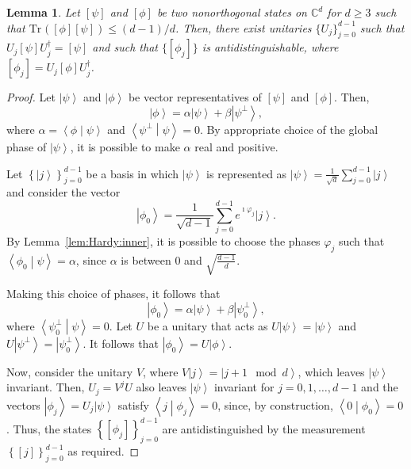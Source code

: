\documentclass[DIV=calc,fontsize=12pt]{scrartcl} %
\theoremstyle{definition}
\theoremstyle{plain}
\newtheorem{lemma}[definition]{Lemma}
\newcommand{\Ket}[1]{\ensuremath{\left \vert #1 \right \rangle}}
\newcommand{\BraKet}[2]{\ensuremath{\left \langle #1 \middle \vert #2
\right \rangle}}
\newcommand{\Proj}[1]{\ensuremath{\left [ #1 \right ]}}
\newcommand{\Tr}[2][]{\ensuremath{\text{Tr}_{#1} \left ( #2 \right )}}
\begin{document}
\begin{lemma}
\label{lem:Hardy:qstates}
Let $\Proj{\psi}$ and $\Proj{\phi}$ be two nonorthogonal states on
$\mathbb{C}^d$ for $d \geq 3$ such that $\Tr{\Proj{\phi}\Proj{\psi}}
\leq (d-1)/d$.  Then, there exist unitaries $\{U_j\}_{j=0}^{d-1}$
such that $U_j \Proj{\psi} U_j^{\dagger} = \Proj{\psi}$ and such
that $\{\Proj{\phi_j}\}$ is antidistinguishable, where $
\Proj{\phi_j} = U_j \Proj{\phi} U_j^{\dagger}$.
\end{lemma}
\begin{proof}
Let $\Ket{\psi}$ and $\Ket{\phi}$ be vector representatives of
$\Proj{\psi}$ and $\Proj{\phi}$.  Then,
\begin{equation}
\Ket{\phi} = \alpha \Ket{\psi} + \beta \Ket{\psi^{\perp}},
\end{equation}
where $\alpha = \BraKet{\phi}{\psi}$ and
$\BraKet{\psi^{\perp}}{\psi} = 0$.  By appropriate choice of the
global phase of $\Ket{\psi}$, it is possible to make $\alpha$ real
and positive.

Let $\left \{ \Ket{j} \right \}_{j=0}^{d-1}$ be a basis in which
$\Ket{\psi}$ is represented as $\Ket{\psi} = \frac{1}{\sqrt{d}}
\sum_{j=0}^{d-1} \Ket{j}$ and consider the vector
\begin{equation}
\Ket{\phi_0} = \frac{1}{\sqrt{d-1}}\sum_{j=0}^{d-1} e^{\imath \varphi_j} \Ket{j}.
\end{equation}
By Lemma~\ref{lem:Hardy:inner}, it is possible to choose the phases
$\varphi_j$ such that $\BraKet{\phi_0}{\psi} = \alpha$, since
$\alpha$ is between $0$ and $\sqrt{\frac{d-1}{d}}$.

Making this choice of phases, it follows that
\begin{equation}
\Ket{\phi_0} = \alpha \Ket{\psi} + \beta \Ket{\psi^{\perp}_0},
\end{equation}
where $\BraKet{\psi^{\perp}_0}{\psi} = 0$.  Let $U$ be a unitary
that acts as $U \Ket{\psi} = \Ket{\psi}$ and $U \Ket{\psi^{\perp}} =
\Ket{\psi^{\perp}_0}$.  It follows that $\Ket{\phi_0} = U
\Ket{\phi}$.

Now, consider the unitary $V$, where $V\Ket{j} = \Ket{j + 1 \mod
d}$, which leaves $\Ket{\psi}$ invariant.  Then, $U_j = V^jU$ also
leaves $\Ket{\psi}$ invariant for $j = 0,1,\ldots,d-1$ and the
vectors $\Ket{\phi_j} = U_j\Ket{\psi}$ satisfy $\BraKet{j}{\phi_j} =
0$, since, by construction, $\BraKet{0}{\phi_0} = 0$.  Thus, the
states $\left \{ \Proj{\phi_j} \right \}_{j=0}^{d-1}$ are
antidistinguished by the measurement $\left \{\Proj{j} \right
\}_{j=0}^{d-1}$ as required.
\end{proof}
\end{document}
